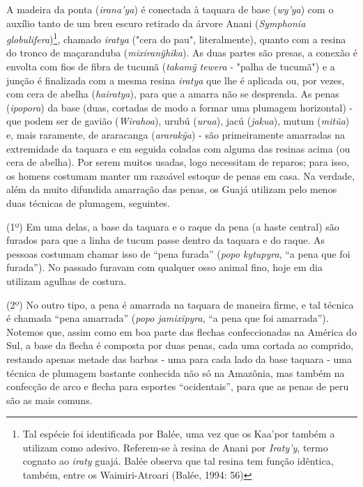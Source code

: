 A madeira da ponta (\emph{irana'ya}) é conectada à taquara de base
(\emph{wy'ya}) com o auxílio tanto de um breu escuro retirado da árvore
Anani (\emph{Symphonia globulifera})\footnote{Tal espécie foi
  identificada por Balée, uma vez que os Kaa'por também a utilizam como
  adesivo. Referem-se à resina de Anani por \emph{Iraty'y}, termo
  cognato ao \emph{iraty} guajá. Balée observa que tal resina tem função
  idêntica, também, entre os Waimiri-Atroari (Balée, 1994: 56)}, chamado
\emph{iratya} ("cera do pau", literalmente), quanto com a resina do
tronco de maçaranduba (\emph{mixiranỹhika}). As duas partes são presas,
a conexão é envolta com fios de fibra de tucumã (\emph{takamỹ}
\emph{tewera} - "palha de tucumã") e a junção é finalizada com a mesma
resina \emph{iratya} que lhe é aplicada ou, por vezes, com cera de
abelha (\emph{hairatya}), para que a amarra não se desprenda. As penas
(\emph{ipopora}) da base (duas, cortadas de modo a formar uma plumagem
horizontal) - que podem ser de gavião (\emph{Wirahoa}), urubú
(\emph{urua}), jacú (\emph{jakua}), mutum (\emph{mitũa}) e, mais
raramente, de araracanga (\emph{ararakỹa}) - são primeiramente amarradas
na extremidade da taquara e em seguida coladas com alguma das resinas
acima (ou cera de abelha). Por serem muitos usadas, logo necessitam de
reparos; para isso, os homens costumam manter um razoável estoque de
penas em casa. Na verdade, além da muito difundida amarração das penas,
os Guajá utilizam pelo menos duas técnicas de plumagem, seguintes.

(1º) Em uma delas, a base da taquara e o raque da pena (a haste central)
são furados para que a linha de tucum passe dentro da taquara e do
raque. As pessoas costumam chamar isso de ``pena furada'' (\emph{popo
kytupyra}, ``a pena que foi furada''). No passado furavam com qualquer
osso animal fino, hoje em dia utilizam agulhas de costura.

(2º) No outro tipo, a pena é amarrada na taquara de maneira firme, e tal
técnica é chamada ``pena amarrada'' (\emph{popo jamixĩpyra}, ``a pena
que foi amarrada''). Notemos que, assim como em boa parte das flechas
confeccionadas na América do Sul, a base da flecha é composta por duas
penas, cada uma cortada ao comprido, restando apenas metade das barbas -
uma para cada lado da base taquara - uma técnica de plumagem bastante
conhecida não só na Amazônia, mas também na confecção de arco e flecha
para esportes ``ocidentais'', para que as penas de peru são as mais
comuns.

